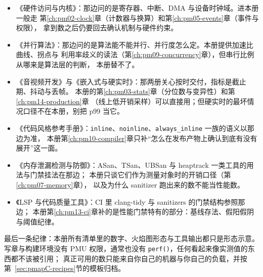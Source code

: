 \documentclass[12pt,a4paper,fontset=fandol]{ctexbook}
\newcommand{\Fn}[1]{\texttt{#1()}}
\newcommand{\Tp}[1]{\texttt{#1}}
\newcommand{\Bk}{\discretionary{}{}{}}
\newcommand{\Mx}[1]{\textsf{#1}}
\begin{document}
\begin{itemize}
  \item 《硬件访问与内核》：那边问的是寄存器、中断、DMA 与设备时钟域。进本册一般走
        第\ref{ch:pm02-clock}章（计数器与换算）和第\ref{ch:pm05-events}章（事件与权限），
        拿到数之后仍要回去确认机制与硬件约束。
  \item 《并行算法》：那边问的是算法能不能并行、并行度怎么定。本册提供加速比曲线、拐点与
        利用率歧义的读法（第\ref{ch:pm09-concurrency}章），但串行比例从哪来是算法层的判断，
        本册替不了。
  \item 《音视频开发》与《嵌入式与硬实时》：那两册关心按时交付，指标是截止期、抖动与丢帧。
        本册的第\ref{ch:pm03-stats}章（分位数与变异性）和第\ref{ch:pm14-production}章
        （线上低开销采样）可以直接用；但硬实时的最坏情况口径不在本册，别把 \Mx{p99} 当它。
  \item 《代码风格参考手册》：\Tp{inline}、\Tp{noinline}、\Tp{always\_{\Bk}inline} 一族的语义以那边为准，
        本册第\ref{ch:pm10-compiler}章只补``怎么在发布产物上确认到底有没有展开''这一面。
  \item 《内存泄漏检测与防御》：ASan、TSan、UBSan 与 heaptrack 一类工具的用法与门禁挂法在那边；
        本册只谈它们作为测量对象时的开销口径（第\ref{ch:pm07-memory}章），
        以及为什么 sanitizer 跑出来的数不能当性能数。
  \item 《LSP 与代码质量工具》：CI 里 clang-tidy 与 sanitizers 的门禁结构参照那边；
        本册第\ref{ch:pm13-ci}章补的是性能门禁特有的部分：基线存法、假阳假阴与阈值纪律。
\end{itemize}

最后一条纪律：本册所有清单里的数字、火焰图形态与工具输出都只是形态示意。
写章与构建环境没有 PMU 权限，通常也没有 \Fn{perf}，任何看起来像实测值的东西都不该被引用；
真正可用的数只能来自你自己的机器与你自己的负载，并按第~\ref{sec:pmapC-recipes}节的模板归档。
\end{document}
